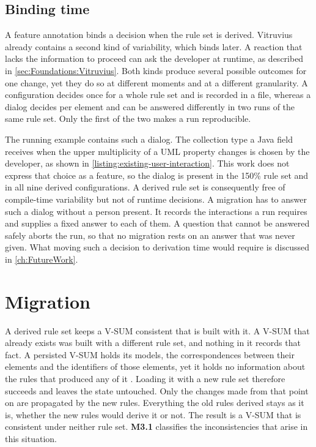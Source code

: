 \subsection{Binding time}
\label{sec:Concept:FeatureAnnotations:BindingTime}

A feature annotation binds a decision when the rule set is derived.
Vitruvius already contains a second kind of variability, which binds later.
A reaction that lacks the information to proceed can ask the developer at runtime, as described in \autoref{sec:Foundations:Vitruvius}.
Both kinds produce several possible outcomes for one change, yet they do so at different moments and at a different granularity.
A configuration decides once for a whole rule set and is recorded in a file, whereas a dialog decides per element and can be answered differently in two runs of the same rule set.
Only the first of the two makes a run reproducible.

The running example contains such a dialog.
The collection type a Java field receives when the upper multiplicity of a UML property changes is chosen by the developer, as shown in \autoref{listing:existing-user-interaction}.
This work does not express that choice as a feature, so the dialog is present in the 150\% rule set and in all nine derived configurations.
A derived rule set is consequently free of compile-time variability but not of runtime decisions.
A migration has to answer such a dialog without a person present.
It records the interactions a run requires and supplies a fixed answer to each of them.
A question that cannot be answered safely aborts the run, so that no migration rests on an answer that was never given.
What moving such a decision to derivation time would require is discussed in \autoref{ch:FutureWork}.

\section{Migration}
\label{sec:Concept:Migration}

A derived rule set keeps a V-SUM consistent that is built with it.
A V-SUM that already exists was built with a different rule set, and nothing in it records that fact.
A persisted V-SUM holds its models, the correspondences between their elements and the identifiers of those elements, yet it holds no information about the rules that produced any of it \cite{vitruviusGithub}.
Loading it with a new rule set therefore succeeds and leaves the state untouched.
Only the changes made from that point on are propagated by the new rules.
Everything the old rules derived stays as it is, whether the new rules would derive it or not.
The result is a V-SUM that is consistent under neither rule set.
\textbf{M3.1} classifies the inconsistencies that arise in this situation.

